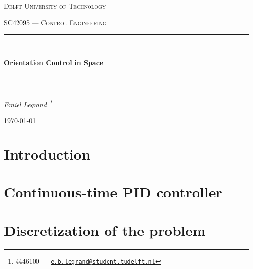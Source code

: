\documentclass{article}
\date{\today}
\renewcommand*{\thefootnote}{\fnsymbol{footnote}}
\begin{document}
\begin{titlepage}
	\centering
	\vspace{2cm}
	{\scshape\large Delft University of Technology \par}
	\vspace{1cm}
	{\scshape\large SC42095 --- Control Engineering\par}
	\vspace{3cm}
	\rule{\linewidth}{1.2pt}\\[0.5cm]
    {\huge\bfseries Orientation Control in Space\par}
	\vspace{0.5cm}
	\rule{\linewidth}{1.2pt}\\[0.5cm]
	\vspace{1.5cm}
	{\Large\itshape Emiel Legrand \footnote{4446100 ---  \href{mailto:e.b.legrand@student.tudelft.nl}{\texttt{e.b.legrand@student.tudelft.nl}}} \par}
	\vfill

	{\large \today\par}
	\vfill
\end{titlepage}

\renewcommand*{\thefootnote}{\arabic{footnote}}
\setcounter{footnote}{0}

\clearpage
\renewcommand{\thepage}{\roman{page}}%

\setcounter{page}{1}
\tableofcontents
\clearpage

\renewcommand{\thepage}{\arabic{page}}%
\setcounter{page}{1}
\clearpage

\section{Introduction}

\clearpage

\section{Continuous-time PID controller}
\label{sec:continuous}

\clearpage

\section{Discretization of the problem}
\label{sec:discretise}

\clearpage
\end{document}
